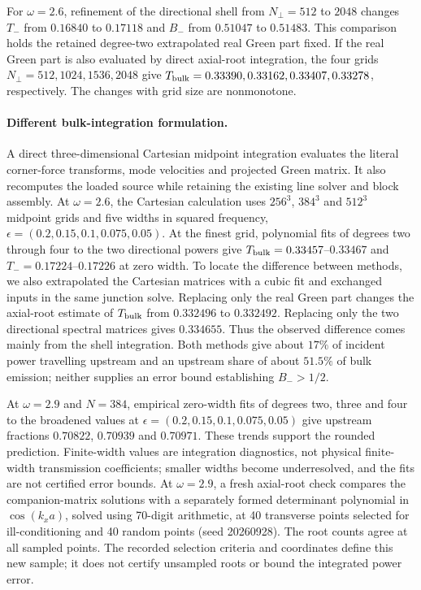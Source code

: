 \documentclass[10pt,aps,onecolumn,notitlepage,nofootinbib]{revtex4-2}
\begin{document}
For $\omega=2.6$, refinement of the directional shell from $N_\perp=512$ to $2048$ changes $T_-$ from $0.16840$ to $0.17118$ and $B_-$ from $0.51047$ to $0.51483$. This comparison holds the retained degree-two extrapolated real Green part fixed. If the real Green part is also evaluated by direct axial-root integration, the four grids $N_\perp=512,1024,1536,2048$ give $T_{\rm bulk}=0.33390,0.33162,0.33407,0.33278$, respectively. The changes with grid size are nonmonotone.

\paragraph*{Different bulk-integration formulation.}
A direct three-dimensional Cartesian midpoint integration evaluates the literal corner-force transforms, mode velocities and projected Green matrix. It also recomputes the loaded source while retaining the existing line solver and block assembly. At $\omega=2.6$, the Cartesian calculation uses $256^3$, $384^3$ and $512^3$ midpoint grids and five widths in squared frequency, $\epsilon=(0.2,0.15,0.1,0.075,0.05)$. At the finest grid, polynomial fits of degrees two through four to the two directional powers give $T_{\rm bulk}=0.33457$--$0.33467$ and $T_-=0.17224$--$0.17226$ at zero width. To locate the difference between methods, we also extrapolated the Cartesian matrices with a cubic fit and exchanged inputs in the same junction solve. Replacing only the real Green part changes the axial-root estimate of $T_{\rm bulk}$ from $0.332496$ to $0.332492$. Replacing only the two directional spectral matrices gives $0.334655$. Thus the observed difference comes mainly from the shell integration. Both methods give about $17\%$ of incident power travelling upstream and an upstream share of about $51.5\%$ of bulk emission; neither supplies an error bound establishing $B_->1/2$.

At $\omega=2.9$ and $N=384$, empirical zero-width fits of degrees two, three and four to the broadened values at $\epsilon=(0.2,0.15,0.1,0.075,0.05)$ give upstream fractions $0.70822$, $0.70939$ and $0.70971$. These trends support the rounded prediction. Finite-width values are integration diagnostics, not physical finite-width transmission coefficients; smaller widths become underresolved, and the fits are not certified error bounds. At $\omega=2.9$, a fresh axial-root check compares the companion-matrix solutions with a separately formed determinant polynomial in $\cos(k_xa)$, solved using 70-digit arithmetic, at 40 transverse points selected for ill-conditioning and 40 random points (seed 20260928). The root counts agree at all sampled points. The recorded selection criteria and coordinates define this new sample; it does not certify unsampled roots or bound the integrated power error.
\end{document}
